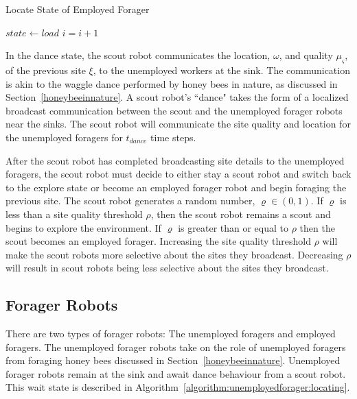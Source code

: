 \begin{algorithm}
\caption{Locate State of Employed Forager}
\label{algorithm:employedforager:locating}
\begin{algorithmic}[1]
	\State {}
	\State {}
		\State $state \gets load$
	\EndIf
	\State $i =i + 1$
\EndFunction
\end{algorithmic}
\end{algorithm}

In the dance state, the scout robot communicates the location, $\omega$, and quality $\mu_\varsigma$, of the previous site $\xi$, to the unemployed workers at the sink. The communication is akin to the waggle dance performed by honey bees in nature, as discussed in Section~\ref{honeybeeinnature}. A scout robot's ``dance" takes the form of a localized broadcast communication between the scout and the unemployed forager robots near the sinks. The scout robot will communicate the site quality and location for the unemployed foragers for $t_{dance}$ time steps.

After the scout robot has completed broadcasting site details to the unemployed foragers, the scout robot must decide to either stay a scout robot and switch back to the explore state or become an employed forager robot and begin foraging the previous site. The scout robot generates a random number, $\varrho\in(0,1)$. If $\varrho$ is less than a site quality threshold $\rho$, then the scout robot remains a scout and begins to explore the environment. If $\varrho$ is greater than or equal to $\rho$ then the scout becomes an employed forager. Increasing the site quality threshold $\rho$ will make the scout robots more selective about the sites they broadcast. Decreasing $\rho$ will result in scout robots being less selective about the sites they broadcast.

\subsection{Forager Robots}

There are two types of forager robots: The unemployed foragers and employed foragers. The unemployed forager robots take on the role of unemployed foragers from foraging honey bees discussed in Section~\ref{honeybeeinnature}. Unemployed forager robots remain at the sink and await dance behaviour from a scout robot. This wait state is described in Algorithm~\ref{algorithm:unemployedforager:locating}.

